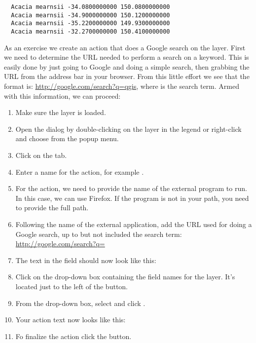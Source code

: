 \begin{verbatim}
  Acacia mearnsii -34.0800000000 150.0800000000
  Acacia mearnsii -34.9000000000 150.1200000000
  Acacia mearnsii -35.2200000000 149.9300000000
  Acacia mearnsii -32.2700000000 150.4100000000
\end{verbatim} 

As an exercise we create an action that does a Google search on the 
 layer. First we need to determine the URL needed to perform a search on a
keyword. This is easily done by just going to Google and doing a simple
search, then grabbing the URL from the address bar in your browser. From this
little effort we see that the format is: \url{http://google.com/search?q=qgis},
where  is the search term. Armed with this information, we can
proceed:

\begin{enumerate}
\item Make sure the  layer is loaded.
\item Open the  dialog by double-clicking on the layer in the
  legend or right-click and choose  from the popup menu.
\item Click on the  tab.
\item Enter a name for the action, for example .
\item For the action, we need to provide the name of the external program to
  run. In this case, we can use Firefox. If the program is not in
  your path, you need to provide the full path.
\item Following the name of the external application, add the URL used for
  doing a Google search, up to but not included the search term:
  \url{http://google.com/search?q=}
\item The text in the  field should now look like this:\\
\item Click on the drop-down box containing the field names for the
   layer. It's located just to the left of the
   button.
\item From the drop-down box, select  and click .
\item Your action text now looks like this:\\ 
\item Fo finalize the action click the  button.
\end{enumerate}
 
